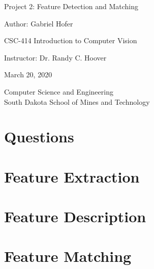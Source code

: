 \documentclass[12pt]{article}
\begin{document}
\begin{titlepage}
   \begin{center}
       \vspace*{1cm}
       \Large
       Project 2: Feature Detection and Matching
       \normalsize

       \vspace{0.5cm}

       Author: Gabriel Hofer

       \vspace{0.5cm}

       CSC-414 Introduction to Computer Vision

       \vspace{0.5cm}

       Instructor: Dr. Randy C. Hoover

       \vspace{0.5cm}

       March 20, 2020

       \vfill

       Computer Science and Engineering\\
       South Dakota School of Mines and Technology\\
   \end{center}
\end{titlepage}
\newpage
\section{Questions}

\section{Feature Extraction}
\section{Feature Description}
\section{Feature Matching}
\end{document}
